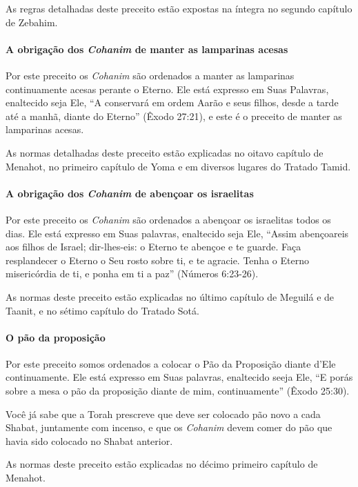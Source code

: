 As regras detalhadas deste preceito estão expostas na íntegra no segundo
capítulo de Zebahim.

\paragraph{A obrigação dos \textit{Cohanim} de manter as lamparinas acesas}

Por este preceito os \textit{Cohanim} são ordenados a manter as lamparinas
continuamente acesas perante o Eterno. Ele está expresso em Suas
Palavras, enaltecido seja Ele, ``A conservará em ordem Aarão e seus
filhos, desde a tarde até a manhã, diante do Eterno'' (Êxodo 27:21), e
este é o preceito de manter as lamparinas acesas.

As normas detalhadas deste preceito estão explicadas no oitavo capítulo
de Menahot, no primeiro capítulo de Yoma e em diversos lugares do
Tratado Tamid.

\paragraph{A obrigação dos \textit{Cohanim} de abençoar os israelitas}

Por este preceito os \textit{Cohanim} são ordenados a abençoar os israelitas
todos os dias. Ele está expresso em Suas palavras, enaltecido seja Ele,
``Assim abençoareis aos filhos de Israel; dir-lhes-eis: o Eterno te
abençoe e te guarde. Faça resplandecer o Eterno o Seu rosto sobre ti, e
te agracie. Tenha o Eterno misericórdia de ti, e ponha em ti a paz''
(Números 6:23-26).

As normas deste preceito estão explicadas no último capítulo de Meguilá
e de Taanit, e no sétimo capítulo do Tratado Sotá.

\paragraph{O pão da proposição}

Por este preceito somos ordenados a colocar o Pão da Proposição diante
d'Ele continuamente. Ele está expresso em Suas palavras, enaltecido
seeja Ele, ``E porás sobre a mesa o pão da proposição diante de mim,
continuamente'' (Êxodo 25:30).

Você já sabe que a Torah prescreve que deve ser colocado pão novo a cada Shabat, juntamente com incenso, e que os \textit{Cohanim} devem
comer do pão que havia sido colocado no Shabat anterior.

As normas deste preceito estão explicadas no décimo primeiro capítulo
de Menahot.

